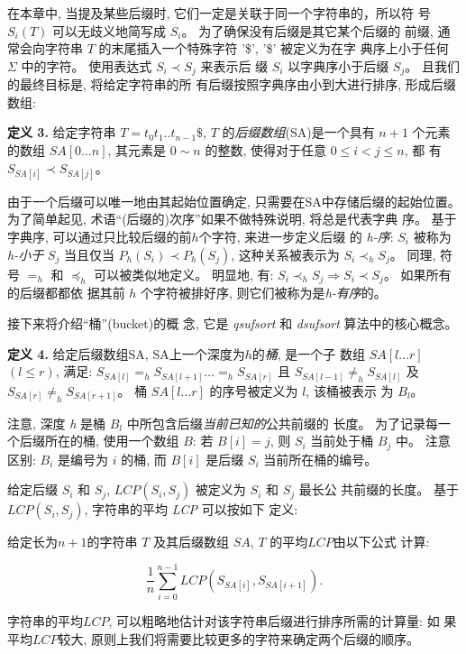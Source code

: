 在本章中, 当提及某些后缀时, 它们一定是关联于同一个字符串的，所以符
号 $S_i(T)$ 可以无歧义地简写成 $S_i$。 为了确保没有后缀是其它某个后缀的
前缀, 通常会向字符串 $T$ 的末尾插入一个特殊字符 '\$', '\$' 被定义为在字
典序上小于任何 $\Sigma$ 中的字符。 使用表达式 $S_i \prec S_j$ 来表示后
缀 $S_i$ 以字典序小于后缀 $S_j$。 且我们的最终目标是, 将给定字符串的所
有后缀按照字典序由小到大进行排序, 形成后缀数组:

\textbf{定义 3.} 给定字符串 $T = t_0t_1..t_{n-1}\$$,
$T$ 的\emph{后缀数组}(SA)是一个具有 $n+1$ 个元素的数组 $SA[0 \dots
n]$, 其元素是 $0 \sim n$ 的整数, 使得对于任意 $0 \leq i < j \leq n$, 都
有 $S_{SA[i]} \prec S_{SA[j]}$。

由于一个后缀可以唯一地由其起始位置确定, 只需要在SA中存储后缀的起始位置。
为了简单起见, 术语“(后缀的)次序”如果不做特殊说明, 将总是代表字典
序。 基于字典序, 可以通过只比较后缀的前$h$个字符, 来进一步定义后缀
的 \emph{h-序}: $S_i$ 被称为 \emph{h-小于} $S_j$ 当且仅当 $P_h(S_i)
\prec P_h(S_j)$, 这种关系被表示为 $S_i \prec_h
S_j$。  同理, 符号 $=_h$ 和 $\preceq_h$ 可以被类似地定义。 明显地, 有:
$S_i \prec_h S_j \Longrightarrow S_i \prec S_j$。 如果所有的后缀都都依
据其前 $h$ 个字符被排好序, 则它们被称为是\emph{h-有序}的。

接下来将介绍“桶”(bucket)的概
念, 它是 \emph{qsufsort} 和 \emph{dsufsort} 算法中的核心概念。

\textbf{定义 4.} 给定后缀数组SA, SA上一个深度为$h$的\emph{桶}, 是一个子
数组 $SA[l \dots r]$ $(l \leq r)$, 满足:
$S_{SA[l]} =_h S_{SA[l+1]}\dots =_h S_{SA[r]}$ 且
$S_{SA[l-1]} \neq_h S_{SA[l]}$ 及 $S_{SA[r]} \neq_h
S_{SA[r+1]}$。 桶 $SA[l \dots r]$ 的序号被定义为 $l$, 该桶被表示
为 $B_l$。

注意, 深度 \emph{h} 是桶 $B_l$ 中所包含后缀\emph{当前已知的}公共前缀的
长度。 为了记录每一个后缀所在的桶, 使用一个数组 $B$: 若 $B[i] =
j$, 则 $S_i$ 当前处于桶 $B_j$ 中。 注意区别: $B_i$ 是编号为 $i$ 的桶,
而 $B[i]$ 是后缀 $S_i$ 当前所在桶的编号。

给定后缀 $S_i$ 和 $S_j$, $LCP(S_i, S_j)$ 被定义为 $S_i$ 和 $S_j$ 最长公
共前缀的长度。 基于 $LCP(S_i, S_j)$, 字符串的平均 \emph{LCP} 可以按如下
定义:

给定长为$n+1$的字符串 $T$ 及其后缀数组 $SA$, $T$ 的平均$LCP$由以下公式
计算:

\begin{equation}
\frac{1}{n}\sum_{i=0}^{n-1}LCP(S_{SA[i]},S_{SA[i+1]}).
\end{equation}

字符串的平均$LCP$, 可以粗略地估计对该字符串后缀进行排序所需的计算量: 如
果平均$LCP$较大, 原则上我们将需要比较更多的字符来确定两个后缀的顺序。

